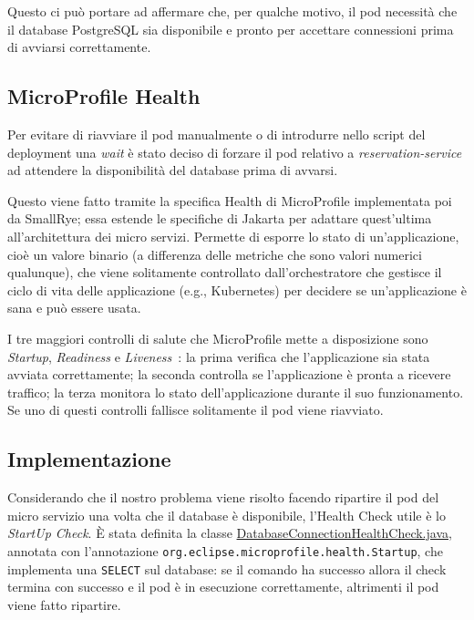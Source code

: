 Questo ci può portare ad affermare che, per qualche motivo, il pod necessità che il database PostgreSQL sia disponibile e pronto per accettare connessioni prima di avviarsi correttamente.

\subsection{MicroProfile Health}

Per evitare di riavviare il pod manualmente o di introdurre nello script del deployment una \textit{wait} è stato deciso di forzare il pod relativo a \textit{reservation-service} ad attendere la disponibilità del database prima di avvarsi.

Questo viene fatto tramite la specifica Health di MicroProfile implementata poi da SmallRye; essa estende le specifiche di Jakarta per adattare quest'ultima all'architettura dei micro servizi. Permette di esporre lo stato di un'applicazione, cioè un valore binario (a differenza delle metriche che sono valori numerici qualunque), che viene solitamente controllato dall'orchestratore che gestisce il ciclo di vita delle applicazione (e.g., Kubernetes) per decidere se un'applicazione è sana e può essere usata.

I tre maggiori controlli di salute che MicroProfile mette a disposizione sono \textit{Startup}, \textit{Readiness} e \textit{Liveness}~\cite{kubernetes_probes}: la prima verifica che l'applicazione sia stata avviata correttamente; la seconda controlla se l'applicazione è pronta a ricevere traffico; la terza monitora lo stato dell'applicazione durante il suo funzionamento. Se uno di questi controlli fallisce solitamente il pod viene riavviato.

\subsection{Implementazione}

Considerando che il nostro problema viene risolto facendo ripartire il pod del micro servizio una volta che il database è disponibile, l'Health Check utile è lo \textit{StartUp Check}. È stata definita la classe \href{https://github.com/edoardosarri24/quarkus-car-rental/blob/master/services/reservation-service/src/main/java/org/acme/reservation/health/DatabaseConnectionHealthCheck.java}{DatabaseConnectionHealthCheck.java}, annotata con l'annotazione \texttt{org.eclipse.microprofile.health.Startup}, che implementa una \texttt{SELECT} sul database: se il comando ha successo allora il check termina con successo e il pod è in esecuzione correttamente, altrimenti il pod viene fatto ripartire.

